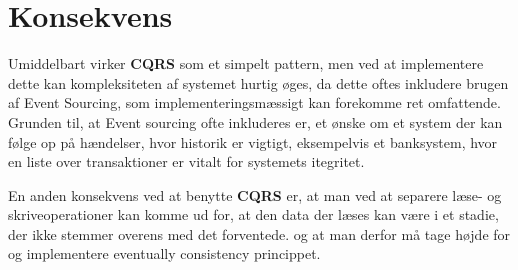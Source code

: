 \section{Konsekvens}
Umiddelbart virker \textbf{CQRS} som et simpelt pattern, men ved at implementere dette kan kompleksiteten af systemet hurtig øges, da dette oftes inkludere brugen af Event Sourcing, som implementeringsmæssigt kan forekomme ret omfattende. Grunden til, at Event sourcing ofte inkluderes er, et ønske om et system der kan følge op på hændelser, hvor historik er vigtigt, eksempelvis et banksystem, hvor en liste over transaktioner er vitalt for systemets itegritet. 

En anden konsekvens ved at benytte \textbf{CQRS} er, at man ved at separere læse- og skriveoperationer kan komme ud for, at den data der læses kan være i et stadie, der ikke stemmer overens med det forventede. og at man derfor må tage højde for og implementere eventually consistency princippet.